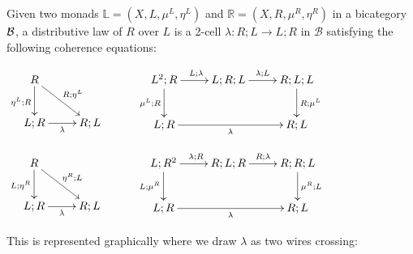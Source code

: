 \begin{definition}
Given two monads $\mathbb{L}=(X,L,\mu^L, \eta^L)$ and $\mathbb{R}=(X,R,\mu^R, \eta^R)$ in a bicategory $\cal B$, a distributive law of $R$ over $L$ is a 2-cell $\lambda:R;L\to L;R$ in $\mathcal B$ satisfying the following coherence equations:


\hfil
$
\xymatrix{
R \ar[dr]^{R;\eta^L} \ar[d]_{\eta^L;R}\\
 L;R \ar[r]_{\lambda}
 & R;L
}
\hspace*{1cm}
\xymatrix{
L^2;R \ar[r]^{L;\lambda} \ar[d]_{\mu^L;R}
 & L;R;L \ar[r]^{\lambda;L}
  & R;L;L \ar[d]^{R;\mu^L}\\
L;R \ar[rr]_{\lambda}
  & 
  &R;L
}
$

\hfil
$
\xymatrix{
R \ar[dr]^{\eta^R;L} \ar[d]_{L;\eta^R}\\
 L;R \ar[r]_{\lambda}
 & R;L
}
\hspace*{1cm}
\xymatrix{
L;R^2 \ar[r]^{\lambda;R} \ar[d]_{L;\mu^R}
 & R;L;R \ar[r]^{R;\lambda}
  & R;R;L \ar[d]^{\mu^R;L}\\
L;R \ar[rr]_{\lambda}
  & 
  &R;L
}
$

This is represented graphically where we draw $\lambda$ as two wires crossing:


\end{definition}
